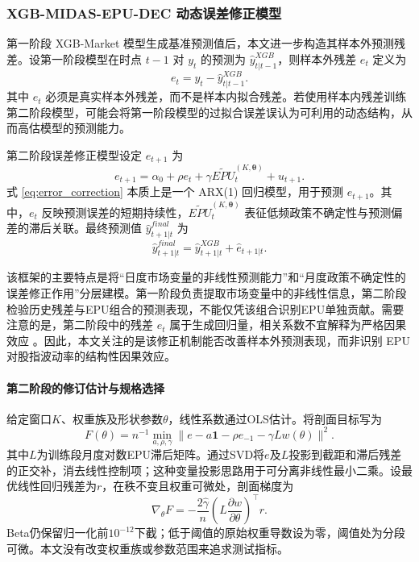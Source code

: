 \subsubsection{XGB-MIDAS-EPU-DEC 动态误差修正模型}

第一阶段 XGB-Market 模型生成基准预测值后，本文进一步构造其样本外预测残差。设第一阶段模型在时点 \(t-1\) 对 \(y_t\) 的预测为 \(\hat{y}^{XGB}_{t|t-1}\)，则样本外残差 $e_t$ 定义为
\begin{equation}
	e_t
	=
	y_t-\hat{y}^{XGB}_{t|t-1}.
\end{equation}
其中 \(e_t\) 必须是真实样本外残差，而不是样本内拟合残差。若使用样本内残差训练第二阶段模型，可能会将第一阶段模型的过拟合误差误认为可利用的动态结构，从而高估模型的预测能力。

第二阶段误差修正模型设定 $e_{t+1}$ 为
\begin{equation}
	e_{t+1}
	=
	\alpha_0
	+
	\rho e_t
	+
	\gamma
	\widetilde{EPU}_{t}^{(K,\boldsymbol{\theta})}
	+
	u_{t+1}.
	\label{eq:error_correction}  
\end{equation}
式 \eqref{eq:error_correction} 本质上是一个 ARX(1) 回归模型，用于预测 $e_{t+1}$。其中，\(e_t\) 反映预测误差的短期持续性，\(\widetilde{EPU}_{t}^{(K,\boldsymbol{\theta})}\) 表征低频政策不确定性与预测偏差的滞后关联。最终预测值 $\hat{y}^{final}_{t+1|t}$ 为
\begin{equation}  
	\hat{y}^{final}_{t+1|t}
	=
	\hat{y}^{XGB}_{t+1|t}
	+
	\hat{e}_{t+1|t}.
\end{equation}

该框架的主要特点是将“日度市场变量的非线性预测能力”和“月度政策不确定性的误差修正作用”分层建模。第一阶段负责提取市场变量中的非线性信息，第二阶段检验历史残差与EPU组合的预测表现，不能仅凭该组合识别EPU单独贡献。需要注意的是，第二阶段中的残差 \(e_t\) 属于生成回归量，相关系数不宜解释为严格因果效应 \citep{Pagan1984}。因此，本文关注的是该修正机制能否改善样本外预测表现，而非识别 EPU 对股指波动率的结构性因果效应。

\paragraph{第二阶段的修订估计与规格选择}
给定窗口$K$、权重族及形状参数$\theta$，线性系数通过OLS估计。将剖面目标写为
\[
 F(\theta)=n^{-1}\min_{a,\rho,\gamma}\|e-a\mathbf1-\rho e_{-1}-\gamma Lw(\theta)\|^2.
\]
其中$L$为训练段月度对数EPU滞后矩阵。通过SVD将$e$及$L$投影到截距和滞后残差的正交补，消去线性控制项；这种变量投影思路用于可分离非线性最小二乘\citep{GolubPereyra1973}。设最优线性回归残差为$r$，在秩不变且权重可微处，剖面梯度为
\[
 \nabla_\theta F=-\frac{2\hat\gamma}{n}\left(L\frac{\partial w}{\partial\theta}\right)^\top r.
\]
Beta仍保留归一化前$10^{-12}$下截；低于阈值的原始权重导数设为零，阈值处为分段可微。本文没有改变权重族或参数范围来追求测试指标。

